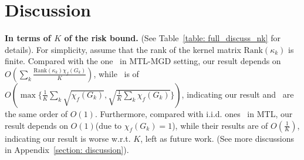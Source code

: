 \documentclass{article}
\newtheorem*{remark}{Remark}
\begin{document}



\section{Discussion} \label{sec: discuss content}

\textbf{In terms of $K$ of the risk bound.} (See Table~\ref{table: full_discuss_nk} for details). For simplicity, assume that the rank of the kernel matrix $\mathrm{Rank}(\kappa_k)$ is finite. Compared with the one~\cite{wu2023macro-auc} in MTL-MGD setting, our result depends on $O(\sum_k \frac{\mathrm{Rank}(\kappa_k) \chi_f(G_k)}{ K})$, while~\cite{wu2023macro-auc} is of $O(\max\{\frac{1}{K} \sum_k \sqrt{\chi_f(G_k)}, \sqrt{\frac{1}{K} \sum_k \chi_f(G_k)} \})$, indicating our result and~\cite{wu2023macro-auc} are the same order of $O(1)$. Furthermore, compared with i.i.d. ones~\cite{yousefi18,watkins2023optimistic} in MTL, our result depends on $O(1)$(due to $\chi_f(G_k)=1$), while their results are of $O(\frac{1}{K})$, indicating our result is worse w.r.t. $K$, left as future work. (See more discussions in Appendix~\ref{section: discussion}).
\end{document}
